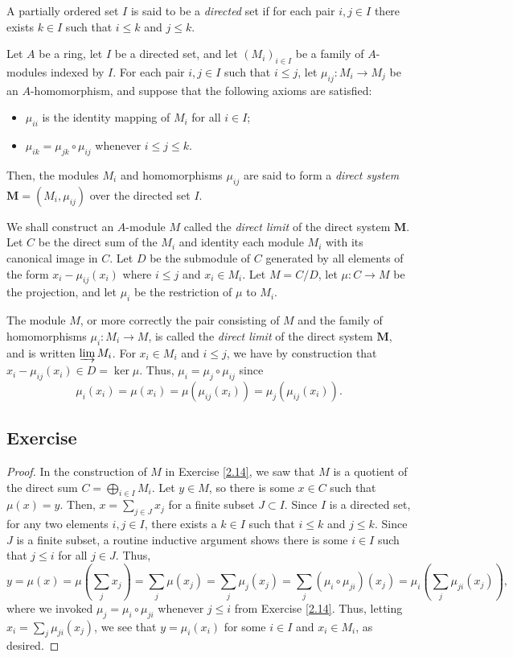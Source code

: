 A partially ordered set $I$ is said to be a {\it directed} set if for each pair $i,j \in I$ there exists $k \in I$ such that $i \le k$ and $j \le k$.

Let $A$ be a ring, let $I$ be a directed set, and let $(M_i)_{i \in I}$ be a family of $A$-modules indexed by $I$. For each pair $i,j \in I$ such that
$i \le j$, let $\mu_{ij} : M_i \to M_j$ be an $A$-homomorphism, and suppose that the following axioms are satisfied:
\begin{itemize}
    \item[(1)] $\mu_{ii}$ is the identity mapping of $M_i$ for all $i \in I$;
    \item[(2)] $\mu_{ik} = \mu_{jk} \circ \mu_{ij}$ whenever $i \le j \le k$.
\end{itemize}
Then, the modules $M_i$ and homomorphisms $\mu_{ij}$ are said to form a {\it direct system} $\mathbf{M} = (M_i, \mu_{ij})$ over the directed set $I$.

We shall construct an $A$-module $M$ called the {\it direct limit} of the direct system $\mathbf{M}$. Let $C$ be the direct sum of the $M_i$ and identity
each module $M_i$ with its canonical image in $C$. Let $D$ be the submodule of $C$ generated by all elements of the form $x_i - \mu_{ij}(x_i)$ where $i \le j$
and $x_i \in M_i$. Let $M = C/D$, let $\mu : C \to M$ be the projection, and let $\mu_i$ be the restriction of $\mu$ to $M_i$.

The module $M$, or more correctly the pair consisting of $M$ and the family of homomorphisms $\mu_i : M_i \to M$, is called the {\it direct limit} of the direct
system $\mathbf{M}$, and is written $\varinjlim M_i$. For $x_i \in M_i$ and $i\le j$, we have by construction that $x_i - \mu_{ij}(x_i) \in D = \ker \mu$.
Thus, $\mu_i = \mu_j \circ \mu_{ij}$ since
$$\mu_i(x_i) = \mu(x_i) = \mu(\mu_{ij}(x_i)) = \mu_j(\mu_{ij}(x_i)).$$

\subsection{Exercise}\label{2.15} %

\begin{proof}
In the construction of $M$ in Exercise \ref{2.14}, we saw that $M$ is a quotient of the direct sum $C = \bigoplus_{i \in I}M_i$. Let $y \in M$, so there is some $x \in C$ such that $\mu(x) = y$. 
Then, $x = \sum_{j \in J}x_j$ for a finite subset $J \subset I$. Since $I$ is a directed set, for any two elements $i,j \in I$, there exists a $k \in I$ such that $i \le k$ and $j \le k$. 
Since $J$ is a finite subset, a routine inductive argument shows there is some $i \in I$ such that $j \le i$ for all $j \in J$. Thus, 
$$y = \mu(x) = \mu\left(\sum_j x_j\right) = \sum_j \mu(x_j) = \sum_j \mu_j(x_j) = \sum_j (\mu_i\circ\mu_{ji})(x_j) = \mu_i\left(\sum_j \mu_{ji}(x_j)\right),$$
where we invoked $\mu_j = \mu_i \circ \mu_{ji}$ whenever $j \le i$ from Exercise \ref{2.14}. Thus, letting $x_i = \sum_j \mu_{ji}(x_j)$, we see that $y = \mu_i(x_i)$ for some $i \in I$ and 
$x_i \in M_i$, as desired.
\end{proof}

